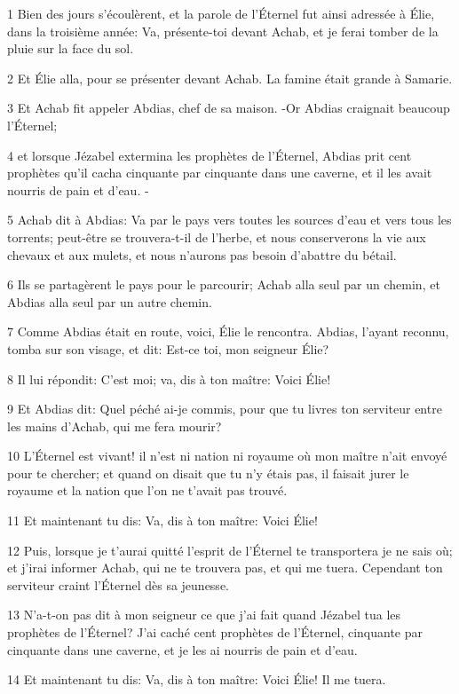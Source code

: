 \par 1 Bien des jours s'écoulèrent, et la parole de l'Éternel fut ainsi adressée à Élie, dans la troisième année: Va, présente-toi devant Achab, et je ferai tomber de la pluie sur la face du sol.
\par 2 Et Élie alla, pour se présenter devant Achab. La famine était grande à Samarie.
\par 3 Et Achab fit appeler Abdias, chef de sa maison. -Or Abdias craignait beaucoup l'Éternel;
\par 4 et lorsque Jézabel extermina les prophètes de l'Éternel, Abdias prit cent prophètes qu'il cacha cinquante par cinquante dans une caverne, et il les avait nourris de pain et d'eau. -
\par 5 Achab dit à Abdias: Va par le pays vers toutes les sources d'eau et vers tous les torrents; peut-être se trouvera-t-il de l'herbe, et nous conserverons la vie aux chevaux et aux mulets, et nous n'aurons pas besoin d'abattre du bétail.
\par 6 Ils se partagèrent le pays pour le parcourir; Achab alla seul par un chemin, et Abdias alla seul par un autre chemin.
\par 7 Comme Abdias était en route, voici, Élie le rencontra. Abdias, l'ayant reconnu, tomba sur son visage, et dit: Est-ce toi, mon seigneur Élie?
\par 8 Il lui répondit: C'est moi; va, dis à ton maître: Voici Élie!
\par 9 Et Abdias dit: Quel péché ai-je commis, pour que tu livres ton serviteur entre les mains d'Achab, qui me fera mourir?
\par 10 L'Éternel est vivant! il n'est ni nation ni royaume où mon maître n'ait envoyé pour te chercher; et quand on disait que tu n'y étais pas, il faisait jurer le royaume et la nation que l'on ne t'avait pas trouvé.
\par 11 Et maintenant tu dis: Va, dis à ton maître: Voici Élie!
\par 12 Puis, lorsque je t'aurai quitté l'esprit de l'Éternel te transportera je ne sais où; et j'irai informer Achab, qui ne te trouvera pas, et qui me tuera. Cependant ton serviteur craint l'Éternel dès sa jeunesse.
\par 13 N'a-t-on pas dit à mon seigneur ce que j'ai fait quand Jézabel tua les prophètes de l'Éternel? J'ai caché cent prophètes de l'Éternel, cinquante par cinquante dans une caverne, et je les ai nourris de pain et d'eau.
\par 14 Et maintenant tu dis: Va, dis à ton maître: Voici Élie! Il me tuera.
